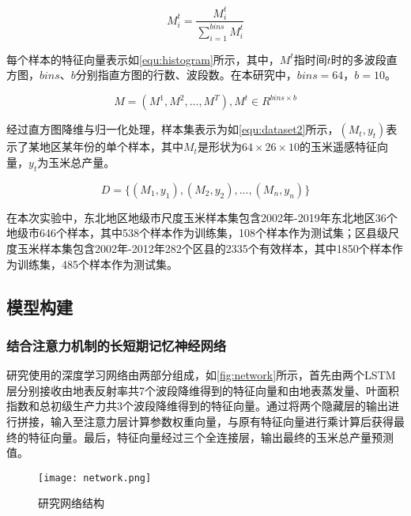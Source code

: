 \begin{equation}
  \label{equ:normalize}
  M^t_{i}=\frac{M^t_{i}}{\sum_{i=1}^{bins}M^t_{i}}
\end{equation}

\par 每个样本的特征向量表示如\autoref{equ:histogram}所示，其中，$M^t$指时间$t$时的多波段直方图，$bins$、$b$分别指直方图的行数、波段数。在本研究中，$bins=64$，$b=10$。

\begin{equation}
  \label{equ:histogram}
  M=(M^1, M^2, ..., M^T), M^t\in R^{bins\times b}
\end{equation}

\par 经过直方图降维与归一化处理，样本集表示为如\autoref{equ:dataset2}所示，$(M_t, y_t)$表示了某地区某年份的单个样本，其中$M_t$是形状为$64\times 26\times 10$的玉米遥感特征向量，$y_t$为玉米总产量。

\begin{equation}
  \label{equ:dataset2}
  D=\{(M_1, y_1),(M_2, y_2), ..., (M_n, y_n)\}
\end{equation}

\par 在本次实验中，东北地区地级市尺度玉米样本集包含2002年-2019年东北地区36个地级市646个样本，其中538个样本作为训练集，108个样本作为测试集；区县级尺度玉米样本集包含2002年-2012年282个区县的2335个有效样本，其中1850个样本作为训练集，485个样本作为测试集。

\subsection{模型构建}
\subsubsection{结合注意力机制的长短期记忆神经网络}

\par 研究使用的深度学习网络由两部分组成，如\autoref{fig:network}所示，首先由两个LSTM层分别接收由地表反射率共7个波段降维得到的特征向量和由地表蒸发量、叶面积指数和总初级生产力共3个波段降维得到的特征向量。通过将两个隐藏层的输出进行拼接，输入至注意力层计算参数权重向量，与原有特征向量进行乘计算后获得最终的特征向量。最后，特征向量经过三个全连接层，输出最终的玉米总产量预测值。

\begin{figure}[ht]
  \centering
  \texttt{[image: network.png]}
  \caption{\label{fig:network}研究网络结构}
\end{figure}

